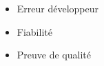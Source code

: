 \begin{itemize}
	\item Erreur développeur
	\item Fiabilité
	\item Preuve de qualité
\end{itemize}
	
